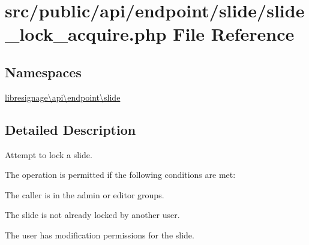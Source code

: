 \hypertarget{src_2public_2api_2endpoint_2slide_2slide__lock__acquire_8php}{}\section{src/public/api/endpoint/slide/slide\+\_\+lock\+\_\+acquire.php File Reference}
\label{src_2public_2api_2endpoint_2slide_2slide__lock__acquire_8php}
\subsection*{Namespaces}
\begin{DoxyCompactItemize}
\item 
 \hyperlink{namespacelibresignage_1_1api_1_1endpoint_1_1slide}{libresignage\textbackslash{}api\textbackslash{}endpoint\textbackslash{}slide}
\end{DoxyCompactItemize}


\subsection{Detailed Description}
Attempt to lock a slide.

The operation is permitted if the following conditions are met\+:


\begin{DoxyItemize}
\item The caller is in the \textquotesingle{}admin\textquotesingle{} or \textquotesingle{}editor\textquotesingle{} groups.
\item The slide is not already locked by another user.
\item The user has modification permissions for the slide.
\end{DoxyItemize}

